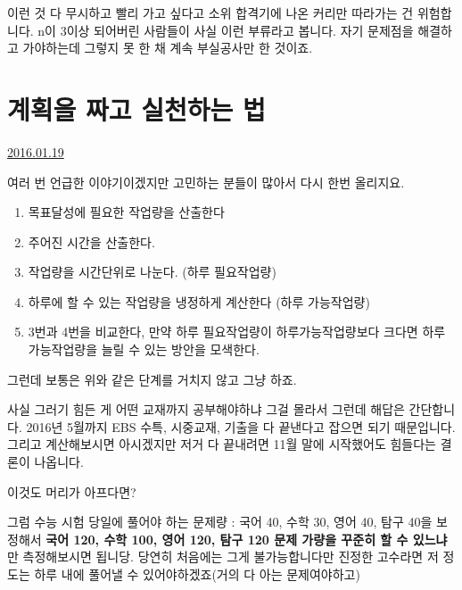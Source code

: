 이런 것 다 무시하고 빨리 가고 싶다고 소위 합격기에 나온 커리만 따라가는 건 위험합니다.
n이 3이상 되어버린 사람들이 사실 이런 부류라고 봅니다. 자기 문제점을 해결하고 가야하는데 그렇지 못 한 채 계속 부실공사만 한 것이죠.
\vspace{5mm}






\section{계획을 짜고 실천하는 법}
\href{https://www.kockoc.com/Apoc/596969}{2016.01.19}

\vspace{5mm}

여러 번 언급한 이야기이겠지만 고민하는 분들이 많아서 다시 한번 올리지요.
\vspace{5mm}
\begin{enumerate}
    \item 목표달성에 필요한 작업량을 산출한다
    \item 주어진 시간을 산출한다.
    \item 작업량을 시간단위로 나눈다. (하루 필요작업량)
    \item 하루에 할 수 있는 작업량을 냉정하게 계산한다 (하루 가능작업량)
    \item 3번과 4번을 비교한다, 만약 하루 필요작업량이 하루가능작업량보다 크다면 하루 가능작업량을 늘릴 수 있는 방안을 모색한다.
\end{enumerate}
\vspace{5mm}

그런데 보통은 위와 같은 단계를 거치지 않고 그냥 하죠.
\vspace{5mm}

사실 그러기 힘든 게 어떤 교재까지 공부해야하냐 그걸 몰라서 그런데 해답은 간단합니다.
2016년 5월까지 EBS 수특, 시중교재, 기출을 다 끝낸다고 잡으면 되기 때문입니다.
그리고 계산해보시면 아시겠지만 저거 다 끝내려면 11월 말에 시작했어도 힘들다는 결론이 나옵니다.
\vspace{5mm}

이것도 머리가 아프다면?
\vspace{5mm}

그럼 수능 시험 당일에 풀어야 하는 문제량 : 국어 40, 수학 30, 영어 40, 탐구 40을 보정해서
\textbf{국어 120, 수학 100, 영어 120, 탐구 120 문제 가량을 꾸준히 할 수 있느냐}만 측정해보시면 됩니당.
당연히 처음에는 그게 불가능합니다만 진정한 고수라면 저 정도는 하루 내에 풀어낼 수 있어야하겠죠(거의 다 아는 문제여야하고)
\vspace{5mm}

